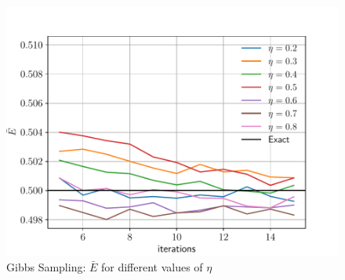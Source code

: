 \documentclass[%
oneside,                 %
final,                   %
10pt]{article}
\begin{document}
\begin{appendices}
\begin{figure}[!h]
        \centering 
         \includegraphics[scale=0.8]{../Results/sim_9/GS_eta.pdf} 
        \caption{Gibbs Sampling:  $\bar E$ for different values of $\eta$ }
        \label{fig:GS_eta}   
\end{figure}  

\end{appendices}
\end{document}
